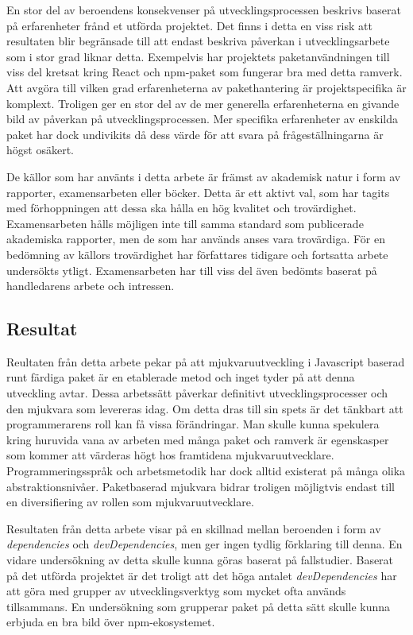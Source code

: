 En stor del av beroendens konsekvenser på utvecklingsprocessen beskrivs baserat på erfarenheter frånd et utförda projektet. Det finns i detta en viss risk att resultaten blir begränsade till att endast beskriva påverkan i utvecklingsarbete som i stor grad liknar detta. Exempelvis har projektets paketanvändningen till viss del kretsat kring React och npm-paket som fungerar bra med detta ramverk. Att avgöra till vilken grad erfarenheterna av pakethantering är projektspecifika är komplext. Troligen ger en stor del av de mer generella erfarenheterna en givande bild av påverkan på utvecklingsprocessen. Mer specifika erfarenheter av enskilda paket har dock undivikits då dess värde för att svara på frågeställningarna är högst osäkert.

De källor som har använts i detta arbete är främst av akademisk natur i form av rapporter, examensarbeten eller böcker. Detta är ett aktivt val, som har tagits med förhoppningen att dessa ska hålla en hög kvalitet och trovärdighet. Examensarbeten hålls möjligen inte till samma standard som publicerade akademiska rapporter, men de som har används anses vara trovärdiga. För en bedömning av källors trovärdighet har författares tidigare och fortsatta arbete undersökts ytligt. Examensarbeten har till viss del även bedömts baserat på handledarens arbete och intressen.

\subsection{Resultat}
\label{subsec:tim-discussion-results}
Reultaten från detta arbete pekar på att mjukvaruutveckling i Javascript baserad runt färdiga paket är en etablerade metod och inget tyder på att denna utveckling avtar. Dessa arbetssätt påverkar definitivt utvecklingsprocesser och den mjukvara som levereras idag. Om detta dras till sin spets är det tänkbart att programmerarens roll kan få vissa förändringar. Man skulle kunna spekulera kring huruvida vana av arbeten med många paket och ramverk är egenskasper som kommer att värderas högt hos framtidena mjukvaruutvecklare. Programmeringsspråk och arbetsmetodik har dock alltid existerat på många olika abstraktionsnivåer. Paketbaserad mjukvara bidrar troligen möjligtvis endast till en diversifiering av rollen som  mjukvaruutvecklare.

Resultaten från detta arbete visar på en skillnad mellan beroenden i form av \textit{dependencies} och \textit{devDependencies}, men ger ingen tydlig förklaring till denna. En vidare undersökning av detta skulle kunna göras baserat på fallstudier. Baserat på det utförda projektet är det troligt att det höga antalet \textit{devDependencies} har att göra med grupper av utvecklingsverktyg som mycket ofta används tillsammans. En undersökning som  grupperar paket på detta sätt skulle kunna erbjuda en bra bild över npm-ekosystemet.


